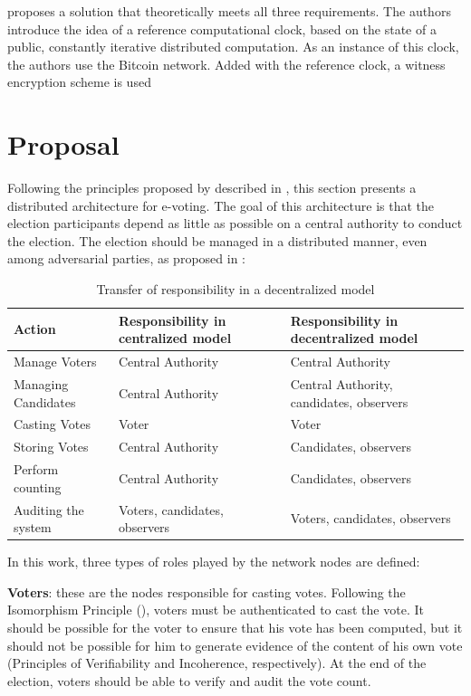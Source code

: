 \documentclass[english]{textolivre}
\begin{document}
\textcite{Liu} proposes a solution that theoretically meets all three requirements. The authors introduce the idea of a reference computational clock, based on the state of a public, constantly iterative distributed computation. As an instance of this clock, the authors use the Bitcoin network. Added with the reference clock, a witness encryption scheme is used \cite{garg2013witness}


\section{Proposal \label{sec-Proposal}}

Following the principles proposed by \textcite{Gritzalis} described in , this section presents a distributed architecture for e-voting. The goal of this architecture is that the election participants depend as little as possible on a central authority to conduct the election. The election should be managed in a distributed manner, even among adversarial parties, as proposed in :

\begin{table}[htpb]
\centering
\small
\begin{threeparttable}
 \caption{Transfer of responsibility in a decentralized model}
 \label{proposal}
 \begin{tabular}{lll}
 \toprule
 Action & Responsibility in centralized model & Responsibility in decentralized model \\
 \midrule 
 Manage Voters & Central Authority & Central Authority \\
 Managing Candidates & Central Authority & Central Authority, candidates, observers \\
 Casting Votes & Voter & Voter \\
 Storing Votes & Central Authority & Candidates, observers \\
 Perform counting & Central Authority & Candidates, observers \\
 Auditing the system & Voters, candidates, observers & Voters, candidates, observers \\
 \bottomrule
\end{tabular}%
\end{threeparttable}
\end{table}

In this work, three types of roles played by the network nodes are defined:

\textbf{Voters}: these are the nodes responsible for casting votes. Following the Isomorphism Principle (), voters must be authenticated to cast the vote. It should be possible for the voter to ensure that his vote has been computed, but it should not be possible for him to generate evidence of the content of his own vote (Principles of Verifiability and Incoherence, respectively). At the end of the election, voters should be able to verify and audit the vote count.
\end{document}
